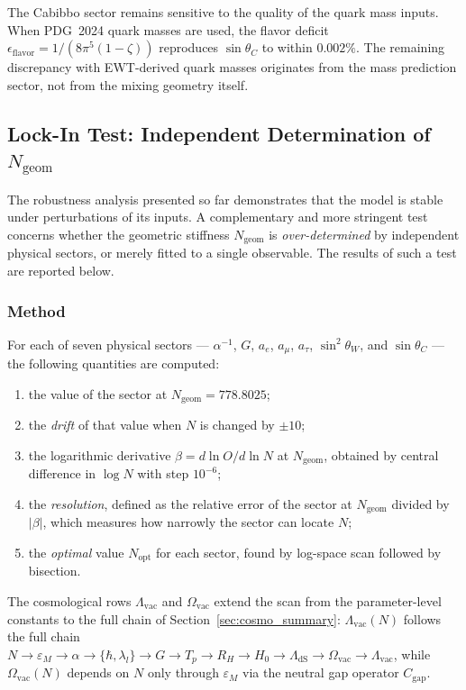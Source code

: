 \documentclass[10pt,a4paper]{article}
\begin{document}
The Cabibbo sector remains sensitive to the quality of the quark mass
inputs. When PDG~2024 quark masses are used, the flavor deficit
$\epsilon_{\text{flavor}} = 1/(8\pi^5(1-\zeta))$ reproduces
$\sin\theta_C$ to within $0.002\%$. The remaining discrepancy with
EWT-derived quark masses originates from the mass prediction sector,
not from the mixing geometry itself.

\subsection{Lock-In Test: Independent Determination of $N_{\text{geom}}$}
\label{sec:lock_in_test}

The robustness analysis presented so far demonstrates that the model is stable
under perturbations of its inputs. A complementary and more stringent test
concerns whether the geometric stiffness $N_{\text{geom}}$ is
\emph{over-determined} by independent physical sectors, or merely fitted to a
single observable. The results of such a test are reported below.

\subsubsection{Method}

For each of seven physical sectors --- $\alpha^{-1}$, $G$, $a_e$, $a_\mu$,
$a_\tau$, $\sin^2\theta_W$, and $\sin\theta_C$ --- the following quantities
are computed:
\begin{enumerate}
	\item the value of the sector at $N_{\text{geom}} = 778.8025$;
	\item the \emph{drift} of that value when $N$ is changed by $\pm 10$;
	\item the logarithmic derivative $\beta = d\ln O / d\ln N$ at
	$N_{\text{geom}}$, obtained by central difference in $\log N$ with
	step $10^{-6}$;
	\item the \emph{resolution}, defined as the relative error of the sector
	at $N_{\text{geom}}$ divided by $|\beta|$, which measures how
	narrowly the sector can locate $N$;
	\item the \emph{optimal} value $N_{\text{opt}}$ for each sector, found by
	log-space scan followed by bisection.
\end{enumerate}

The cosmological rows $\Lambda_{\text{vac}}$ and $\Omega_{\text{vac}}$ extend
the scan from the parameter-level constants to the full chain of
Section~\ref{sec:cosmo_summary}: $\Lambda_{\text{vac}}(N)$ follows the full
chain $N \to \varepsilon_M \to \alpha \to \{\hbar, \lambda_l\} \to G \to T_p
\to R_H \to H_0 \to \Lambda_{\text{dS}} \to \Omega_{\text{vac}} \to
\Lambda_{\text{vac}}$, while $\Omega_{\text{vac}}(N)$ depends on $N$ only
through $\varepsilon_M$ via the neutral gap operator $C_{\text{gap}}$.
\end{document}
